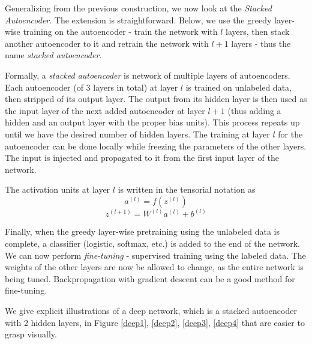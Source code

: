\documentclass[12pt]{article}  %
\begin{document}
Generalizing from the previous construction, we now look at the \emph{Stacked Autoencoder}. The extension is straightforward. Below, we use the greedy layer-wise training on the autoencoder - train the network with $l$ layers, then stack another autoencoder to it and retrain the network with $l+1$ layers - thus the name \emph{stacked autoencoder}.

Formally, a \emph{stacked autoencoder} is network of multiple layers of autoencoders. Each autoencoder (of 3 layers in total) at layer $l$ is trained on unlabeled data, then stripped of its output layer. The output from its hidden layer is then used as the input layer of the next added autoencoder at layer $l+1$ (thus adding a hidden and an output layer with the proper bias units). This process repeats up until we have the desired number of hidden layers. The training at layer $l$ for the autoencoder can be done locally while freezing the parameters of the other layers. The input is injected and propagated to it from the first input layer of the network.

The activation units at layer $l$ is written in the tensorial notation as 
$$a^{(l)} = f(z^{(l)})$$
$$z^{(l+1)} = W^{(l)}a^{(l)} + b^{(l)}$$

Finally, when the greedy layer-wise pretraining using the unlabeled data is complete, a classifier (logistic, softmax, etc.) is added to the end of the network. We can now perform \emph{fine-tuning} - supervised training using the labeled data. The weights of the other layers are now be allowed to change, as the entire network is being tuned. Backpropagation with gradient descent can be a good method for fine-tuning.

We give explicit illustrations of a deep network, which is a stacked autoencoder with 2 hidden layers, in Figure \ref{deep1}, \ref{deep2}, \ref{deep3}, \ref{deep4} that are easier to grasp visually.
\end{document}

